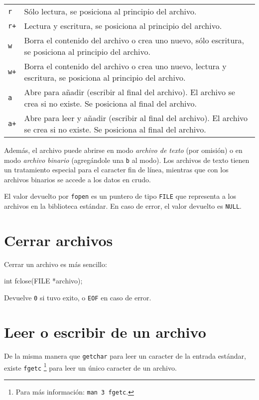 \begin{tabular}{lp{10cm}}
\verb!r!  & Sólo lectura, se posiciona al principio del archivo. \\
\verb!r+! & Lectura y escritura, se posiciona al principio del archivo. \\
\verb!w!  & Borra el contenido del archivo o crea uno nuevo, sólo escritura, se
posiciona al principio del archivo. \\
\verb!w+! & Borra el contenido del archivo o crea uno nuevo, lectura y
escritura, se posiciona al principio del archivo. \\
\verb!a!  & Abre para añadir (escribir al final del archivo). El archivo se
crea si no existe. Se posiciona al final del archivo. \\
\verb!a+! & Abre para leer y añadir (escribir al final del archivo). El
archivo se crea si no existe. Se posiciona al final del archivo.\\
\end{tabular}

Además, el archivo puede abrirse en modo \emph{archivo de texto} (por omisión)
o en modo \emph{archivo binario} (agregándole una \verb!b! al modo). Los
archivos de texto tienen un tratamiento especial para el caracter fin de
línea, mientras que con los archivos binarios se accede a los datos en crudo.

El valor devuelto por \lstinline!fopen! es un puntero de tipo
\lstinline!FILE! que representa a los archivos en la biblioteca estándar. En
caso de error, el valor devuelto es \lstinline!NULL!.

\section{Cerrar archivos}

Cerrar un archivo es más sencillo:

\begin{codigo-c-plano}
int fclose(FILE *archivo);
\end{codigo-c-plano}

Devuelve \lstinline!0! si tuvo exito, o \lstinline!EOF! en caso de error.

\section{Leer o escribir de un archivo}

De la misma manera que \lstinline!getchar!  para leer un caracter de la
entrada estándar, existe \lstinline!fgetc!  \footnote{Para más información:
\texttt{man 3 fgetc}.} para leer un único caracter de un archivo.

